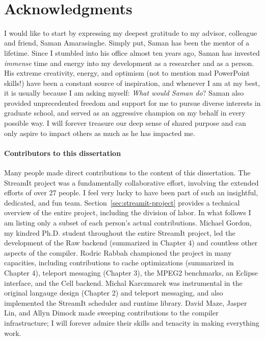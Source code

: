 \newpage
~ \vspace{-3.7\baselineskip}\\
\enlargethispage{0.3\baselineskip}
\section*{Acknowledgments}

I would like to start by expressing my deepest gratitude to my
advisor, colleague and friend, Saman Amarasinghe.  Simply put, Saman
has been the mentor of a lifetime.  Since I stumbled into his office
almost ten years ago, Saman has invested {\it immense} time and energy
into my development as a researcher and as a person.  His extreme
creativity, energy, and optimism (not to mention mad PowerPoint
skills!) have been a constant source of inspiration, and whenever I am
at my best, it is usually because I am asking myself: {\it What would
  Saman do}?  Saman also provided unprecedented freedom and support
for me to pursue diverse interests in graduate school, and served as
an aggressive champion on my behalf in every possible way.  I will
forever treasure our deep sense of shared purpose and can only aspire
to impact others as much as he has impacted me.


\vspace{-8pt}\paragraph*{Contributors to this dissertation} Many
people made direct contributions to the content of this
dissertation.  The StreamIt project was a fundamentally
collaborative effort, involving the extended efforts of over 27
people.  I feel very lucky to have been part of such an insightful,
dedicated, and fun team.  Section~\ref{sec:streamit-project}
provides a technical overview of the entire project, including the
division of labor.  In what follows I am listing only a subset of
each person's actual contributions.  Michael Gordon, my kindred
Ph.D. student throughout the entire StreamIt project, led the
development of the Raw backend (summarized in Chapter 4) and
countless other aspects of the compiler.  Rodric Rabbah championed
the project in many capacities, including contributions to cache
optimizations (summarized in Chapter 4), teleport messaging (Chapter
3), the MPEG2 benchmarks, an Eclipse interface, and the Cell
backend.  Michal Karczmarek was instrumental in the original
langauge design (Chapter 2) and teleport messaging, and also
implemented the StreamIt scheduler and runtime library.  David Maze,
Jasper Lin, and Allyn Dimock made sweeping contributions to the
compiler infrastructure; I will forever admire their skills and
tenacity in making everything work.

